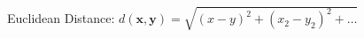 \documentclass[preview]{standalone}
\begin{document}
\begin{center}
Euclidean Distance: $d(\mathbf{x}, \mathbf{y}) = \sqrt{(x - y)^2 + (x_2 - y_2)^2 + \dots}$
\end{center}
\end{document}
